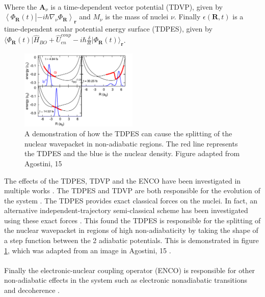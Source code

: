 \\
Where the $\mathbf{A}_{\nu}$ is a time-dependent vector potential (TDVP), given by $\left\langle \Phi_{\mathbf{R}}(t) \right\vert \left. - i \hbar \nabla_{\nu} \Phi_{\mathbf{R}} \right\rangle_{\mathbf{r}}$ and $M_{\nu}$ is the mass of nuclei $\nu$.
Finally $\epsilon(\mathbf{R}, t)$ is a time-dependent scalar potential energy surface (TDPES), given by $\langle \Phi_{\mathbf{R}}(t) \vert \hat{H}_{BO} + \hat{U}_{en}^{coup} - i\hbar \frac{\delta}{\delta t} \vert \Phi_{\mathbf{R}}(t) \rangle_{\mathbf{r}}$.
\\
\begin{figure}
  \includegraphics[width=0.5\textwidth]{./img/CTMQC/nuclear_splitting_TDPES.png}
  \caption{A demonstration of how the TDPES can cause the splitting of the nuclear wavepacket in non-adiabatic regions. The red line represents the TDPES and the blue is the nuclear density. Figure adapted from Agostini, 15 \cite{agostini_exact_2015} \label{fig:step_TDPES}}
\end{figure}
The effects of the TDPES, TDVP and the ENCO have been investigated in multiple works \cite{agostini_semiclassical_2015, agostini_exact_2015, agostini_mixed_2013, abedi_dynamical_2013, Min2014Dec}. The TDPES and TDVP are both responsible for the evolution of the system
\cite{agostini_semiclassical_2015}. The TDPES provides exact classical forces on the nuclei. In fact, an alternative independent-trajectory semi-classical scheme has been investigated using these exact forces \cite{agostini_exact_2015}. This found the TDPES is responsible for the splitting of the nuclear wavepacket in regions of high non-adiabaticity by taking the shape of a step function between the 2 adiabatic potentials. This is demonstrated in figure \ref{fig:step_TDPES}, which was adapted from an image in Agostini, 15 \cite{agostini_semiclassical_2015}. 
\\\\ 
Finally the electronic-nuclear coupling operator (ENCO) is responsible for other non-adiabatic effects in the system such as electronic nonadiabatic transitions and decoherence \cite{agostini_semiclassical_2015}.
